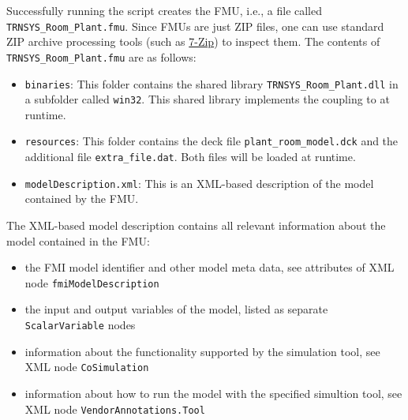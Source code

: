 Successfully running the script creates the FMU, i.e., a file called \verb!TRNSYS_Room_Plant.fmu!.
Since FMUs are just ZIP files, one can use standard ZIP archive processing tools (such as \href{http://www.7-zip.org/}{7-Zip}) to inspect them.
The contents of \verb!TRNSYS_Room_Plant.fmu! are as follows:
\begin{itemize}
  \item \verb!binaries!: This folder contains the shared library \verb!TRNSYS_Room_Plant.dll! in a subfolder called \verb!win32!.
  This shared library implements the coupling to \trnsys at runtime.

  \item \verb!resources!: This folder contains the deck file \verb!plant_room_model.dck! and the additional file \verb!extra_file.dat!. Both files will be loaded at runtime.

  \item \verb!modelDescription.xml!: This is an XML-based description of the model contained by the FMU.

\end{itemize}

The XML-based model description contains all relevant information about the model contained in the FMU:
\begin{itemize}
  \item the FMI model identifier and other model meta data, see attributes of XML node \texttt{fmiModelDescription}

  \item the input and output variables of the model, listed as separate \texttt{ScalarVariable} nodes

  \item information about the functionality supported by the simulation tool, see XML node \verb!CoSimulation!
  
  \item information about how to run the model with the specified simultion tool, see XML node \verb!VendorAnnotations.Tool!
\end{itemize}

